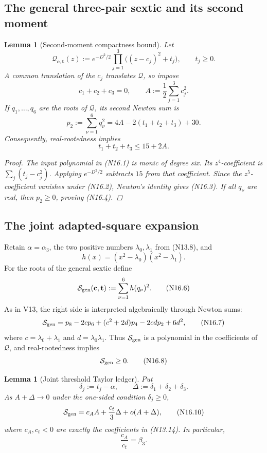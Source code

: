 \documentclass[11pt]{article}
\newtheorem{lemma}[theorem]{Lemma}
\theoremstyle{definition}
\theoremstyle{remark}
\begin{document}
\subsection{The general three-pair sextic and its second moment}

\begin{lemma}[Second-moment compactness bound]
\label{lem:f2v16-second-moment}
Let
\[
 \mathcal Q_{\mathbf c,\mathbf t}(z):=
 e^{-D^2/2}\prod_{j=1}^3\bigl((z-c_j)^2+t_j\bigr),
 \qquad t_j\geq0.
 \tag{N16.1}
\]
A common translation of the \(c_j\) translates \(\mathcal Q\), so impose
\[
 c_1+c_2+c_3=0,\qquad
 A:=\frac12\sum_{j=1}^3c_j^2.
 \tag{N16.2}
\]
If \(q_1,\ldots,q_6\) are the roots of \(\mathcal Q\), its second Newton
sum is
\[
 p_2:=\sum_{\nu=1}^6q_\nu^2
 =4A-2(t_1+t_2+t_3)+30.
 \tag{N16.3}
\]
Consequently, real-rootedness implies
\[
 t_1+t_2+t_3\leq 15+2A.
 \tag{N16.4}
\]

\begin{proof}
The input polynomial in \textup{(N16.1)} is monic of degree six.  Its
\(z^4\)-coefficient is
\(\sum_j(t_j-c_j^2)\).  Applying \(e^{-D^2/2}\) subtracts \(15\) from
that coefficient.  Since the \(z^5\)-coefficient vanishes under
\textup{(N16.2)}, Newton's identity gives \textup{(N16.3)}.  If all
\(q_\nu\) are real, then \(p_2\geq0\), proving \textup{(N16.4)}.
\end{proof}
\end{lemma}

\subsection{The joint adapted-square expansion}

Retain \(\alpha=\alpha_3\), the two positive numbers
\(\lambda_0,\lambda_1\) from \textup{(N13.8)}, and
\[
 h(x)=(x^2-\lambda_0)(x^2-\lambda_1).
 \tag{N16.5}
\]
For the roots of the general sextic define
\[
 \mathcal S_{\rm gen}(\mathbf c,\mathbf t)
 :=\sum_{\nu=1}^6h(q_\nu)^2.
 \tag{N16.6}
\]
As in V13, the right side is interpreted algebraically through Newton
sums:
\[
 \mathcal S_{\rm gen}
 =p_8-2cp_6+(c^2+2d)p_4-2cdp_2+6d^2,
 \tag{N16.7}
\]
where \(c=\lambda_0+\lambda_1\) and
\(d=\lambda_0\lambda_1\).  Thus \(\mathcal S_{\rm gen}\) is a polynomial
in the coefficients of \(\mathcal Q\), and real-rootedness implies
\[
 \mathcal S_{\rm gen}\geq0.
 \tag{N16.8}
\]

\begin{lemma}[Joint threshold Taylor ledger]
\label{lem:f2v16-joint-taylor}
Put
\[
 \delta_j:=t_j-\alpha,\qquad
 \Delta:=\delta_1+\delta_2+\delta_3.
 \tag{N16.9}
\]
As \(A+\Delta\to0\) under the one-sided condition
\(\delta_j\geq0\),
\[
 \mathcal S_{\rm gen}
 =c_AA+\frac{c_t}{3}\Delta+o(A+\Delta),
 \tag{N16.10}
\]
where \(c_A,c_t<0\) are exactly the coefficients in
\textup{(N13.14)}.  In particular,
\[
 \frac{c_A}{c_t}=\beta_3.
 \tag{N16.11}
\]
\end{lemma}
\end{document}
